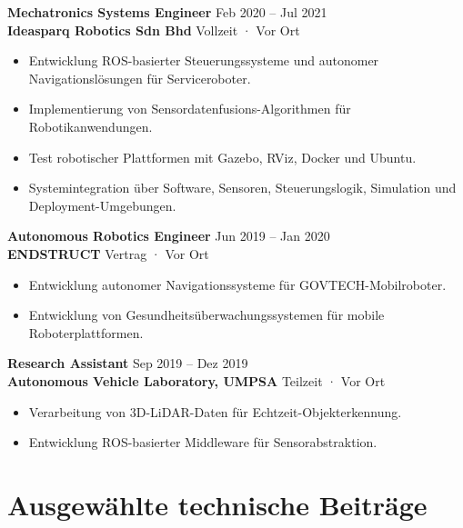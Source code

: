 \documentclass[11pt,a4paper]{article}
\begin{document}
\textbf{Mechatronics Systems Engineer} \hfill Feb 2020 -- Jul 2021\\
\textbf{Ideasparq Robotics Sdn Bhd} \hfill Vollzeit · Vor Ort

\begin{itemize}
    \item Entwicklung ROS-basierter Steuerungssysteme und autonomer Navigationslösungen für Serviceroboter.
    \item Implementierung von Sensordatenfusions-Algorithmen für Robotikanwendungen.
    \item Test robotischer Plattformen mit Gazebo, RViz, Docker und Ubuntu.
    \item Systemintegration über Software, Sensoren, Steuerungslogik, Simulation und Deployment-Umgebungen.
\end{itemize}

\textbf{Autonomous Robotics Engineer} \hfill Jun 2019 -- Jan 2020\\
\textbf{ENDSTRUCT} \hfill Vertrag · Vor Ort

\begin{itemize}
    \item Entwicklung autonomer Navigationssysteme für GOVTECH-Mobilroboter.
    \item Entwicklung von Gesundheitsüberwachungssystemen für mobile Roboterplattformen.
\end{itemize}

\textbf{Research Assistant} \hfill Sep 2019 -- Dez 2019\\
\textbf{Autonomous Vehicle Laboratory, UMPSA} \hfill Teilzeit · Vor Ort

\begin{itemize}
    \item Verarbeitung von 3D-LiDAR-Daten für Echtzeit-Objekterkennung.
    \item Entwicklung ROS-basierter Middleware für Sensorabstraktion.
\end{itemize}

\section*{Ausgewählte technische Beiträge}
\end{document}
